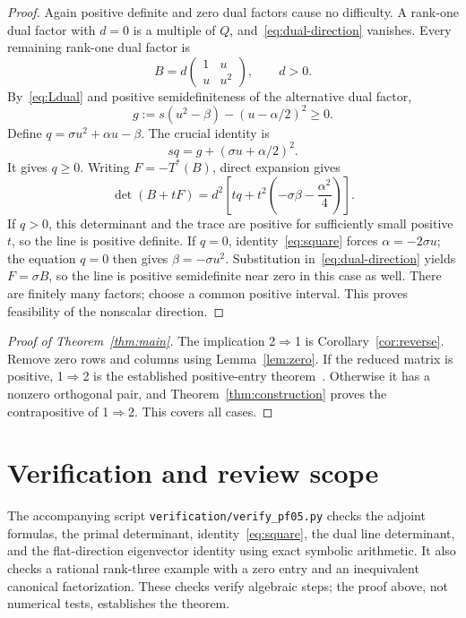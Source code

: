\documentclass[11pt]{article}
\begin{document}
\begin{proof}
Again positive definite and zero dual factors cause no difficulty. A rank-one dual factor with $d=0$ is a multiple of $Q$, and~\eqref{eq:dual-direction} vanishes. Every remaining rank-one dual factor is
\[
 B=d\begin{pmatrix}1&u\\u&u^2\end{pmatrix},\qquad d>0.
\]
By~\eqref{eq:Ldual} and positive semidefiniteness of the alternative dual factor,
\[
 g:=s(u^2-\beta)-(u-\alpha/2)^2\geq0.
\]
Define $q=\sigma u^2+\alpha u-\beta$. The crucial identity is
\begin{equation}\label{eq:square}
 s q=g+(\sigma u+\alpha/2)^2.
\end{equation}
It gives $q\geq0$. Writing $F=-T^*(B)$, direct expansion gives
\[
 \det(B+tF)=d^2\left[tq+t^2\left(-\sigma\beta-\frac{\alpha^2}{4}\right)\right].
\]
If $q>0$, this determinant and the trace are positive for sufficiently small positive $t$, so the line is positive definite. If $q=0$, identity~\eqref{eq:square} forces $\alpha=-2\sigma u$; the equation $q=0$ then gives $\beta=-\sigma u^2$. Substitution in~\eqref{eq:dual-direction} yields $F=\sigma B$, so the line is positive semidefinite near zero in this case as well. There are finitely many factors; choose a common positive interval. This proves feasibility of the nonscalar direction.
\end{proof}

\begin{proof}[Proof of Theorem~\ref{thm:main}]
The implication 2$\Rightarrow$1 is Corollary~\ref{cor:reverse}. Remove zero rows and columns using Lemma~\ref{lem:zero}. If the reduced matrix is positive, 1$\Rightarrow$2 is the established positive-entry theorem~\cite[Theorem 5.2]{dhkm}. Otherwise it has a nonzero orthogonal pair, and Theorem~\ref{thm:construction} proves the contrapositive of 1$\Rightarrow$2. This covers all cases.
\end{proof}

\section{Verification and review scope}
The accompanying script \texttt{verification/verify\_pf05.py} checks the adjoint formulas, the primal determinant, identity~\eqref{eq:square}, the dual line determinant, and the flat-direction eigenvector identity using exact symbolic arithmetic. It also checks a rational rank-three example with a zero entry and an inequivalent canonical factorization. These checks verify algebraic steps; the proof above, not numerical tests, establishes the theorem.
\end{document}
